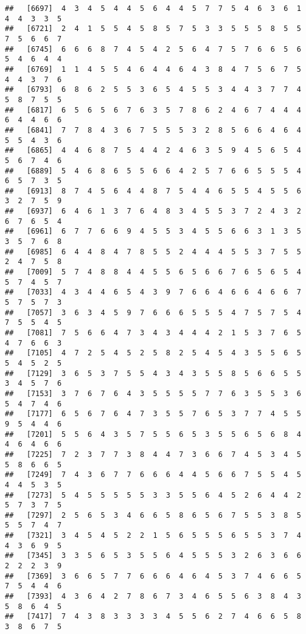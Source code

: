 \documentclass[
]{book}
\begin{document}
\begin{verbatim}
##   [6697]  4  3  4  5  4  4  5  6  4  4  5  7  7  5  4  6  3  6  1  4  4  3  3  5
##   [6721]  2  4  1  5  5  4  5  8  5  7  5  3  3  5  5  5  8  5  5  7  5  6  6  7
##   [6745]  6  6  6  8  7  4  5  4  2  5  6  4  7  5  7  6  6  5  6  5  4  6  4  4
##   [6769]  1  1  4  5  5  4  6  4  4  6  4  3  8  4  7  5  6  7  5  4  4  3  7  6
##   [6793]  6  8  6  2  5  5  3  6  5  4  5  5  3  4  4  3  7  7  4  5  8  7  5  5
##   [6817]  6  5  6  5  6  7  6  3  5  7  8  6  2  4  6  7  4  4  4  6  4  4  6  6
##   [6841]  7  7  8  4  3  6  7  5  5  5  3  2  8  5  6  6  4  6  4  5  5  4  3  6
##   [6865]  4  4  6  8  7  5  4  4  2  4  6  3  5  9  4  5  6  5  4  5  6  7  4  6
##   [6889]  5  4  6  8  6  5  5  6  6  4  2  5  7  6  6  5  5  5  4  6  5  7  3  5
##   [6913]  8  7  4  5  6  4  4  8  7  5  4  4  6  5  5  4  5  5  6  3  2  7  5  9
##   [6937]  6  4  6  1  3  7  6  4  8  3  4  5  5  3  7  2  4  3  2  6  7  6  5  4
##   [6961]  6  7  7  6  6  9  4  5  5  3  4  5  5  6  6  3  1  3  5  3  5  7  6  8
##   [6985]  6  4  4  8  4  7  8  5  5  2  4  4  4  5  5  3  7  5  5  2  4  7  5  8
##   [7009]  5  7  4  8  8  4  4  5  5  6  5  6  6  7  6  5  6  5  4  5  7  4  5  7
##   [7033]  4  3  4  4  6  5  4  3  9  7  6  6  4  6  6  4  6  6  7  5  7  5  7  3
##   [7057]  3  6  3  4  5  9  7  6  6  6  5  5  5  4  7  5  7  5  4  7  5  5  4  5
##   [7081]  7  5  6  6  4  7  3  4  3  4  4  4  2  1  5  3  7  6  5  4  7  6  6  3
##   [7105]  4  7  2  5  4  5  2  5  8  2  5  4  5  4  3  5  5  6  5  5  4  5  2  5
##   [7129]  3  6  5  3  7  5  5  4  3  4  3  5  5  8  5  6  6  5  5  3  4  5  7  6
##   [7153]  3  7  6  7  6  4  3  5  5  5  5  7  7  6  3  5  5  3  6  5  4  7  4  6
##   [7177]  6  5  6  7  6  4  7  3  5  5  7  6  5  3  7  7  4  5  5  9  5  4  4  6
##   [7201]  5  5  6  4  3  5  7  5  5  6  5  3  5  5  6  5  6  8  4  4  6  4  6  6
##   [7225]  7  2  3  7  7  3  8  4  4  7  3  6  6  7  4  5  3  4  5  5  8  6  6  5
##   [7249]  7  4  3  6  7  7  6  6  6  4  4  5  6  6  7  5  5  4  5  4  4  5  3  5
##   [7273]  5  4  5  5  5  5  5  3  3  5  5  6  4  5  2  6  4  4  2  5  7  3  7  5
##   [7297]  2  5  6  5  3  4  6  6  5  8  6  5  6  7  5  5  3  8  5  5  5  7  4  7
##   [7321]  3  4  5  4  5  2  2  1  5  6  5  5  5  6  5  5  3  7  4  4  3  6  9  5
##   [7345]  3  3  5  6  5  3  5  5  6  4  5  5  5  3  2  6  3  6  6  2  2  2  3  9
##   [7369]  3  6  6  5  7  7  6  6  6  4  6  4  5  3  7  4  6  6  5  7  5  4  4  6
##   [7393]  4  3  6  4  2  7  8  6  7  3  4  6  5  5  6  3  8  4  3  5  8  6  4  5
##   [7417]  7  4  3  8  3  3  3  3  4  5  5  6  2  7  4  6  6  5  8  3  8  6  7  5

\end{verbatim}
\end{document}
